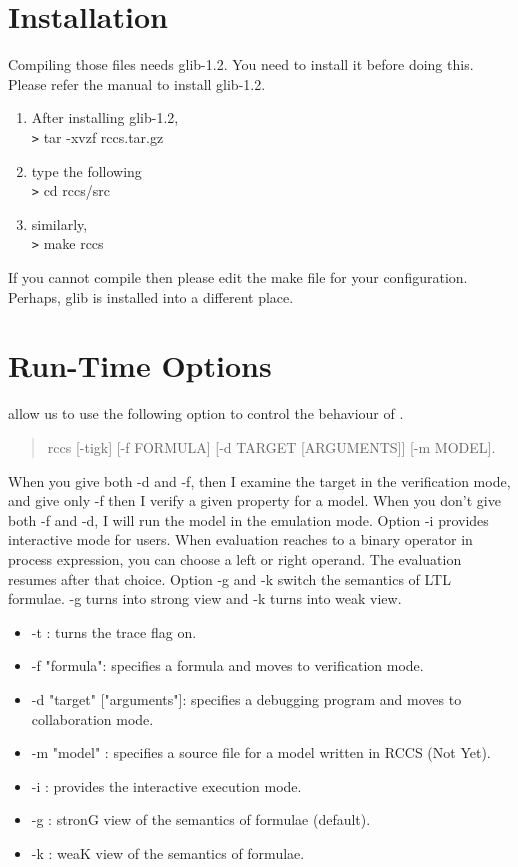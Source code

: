 \documentclass[12pt,a4paper,titlepage]{article}
\theoremstyle{break}
\begin{document}
\section{Installation}
  Compiling those files needs glib-1.2. You need to install it before doing this.
Please refer the manual to install glib-1.2.
  \begin{enumerate}
\item After installing glib-1.2, \\
    \verb|>| tar -xvzf rccs.tar.gz
\item type the following\\
    \verb|>| cd rccs/src
\item  similarly,\\
    \verb|>| make rccs
  \end{enumerate}
If you cannot compile then please edit the make file for your configuration.
Perhaps, glib is installed into a different place.
\section{Run-Time Options}
\NHK allow us to use the following option to control the behaviour of \NHK.
  \begin{quotation}
rccs [-tigk] [-f FORMULA] [-d TARGET [ARGUMENTS]] [-m MODEL].
  \end{quotation}
When you give both -d and -f, then I examine the target in the verification mode, and give only -f then I verify a given property for a model.
When you don't give both -f and -d, I will run the model in the emulation mode.
Option -i provides interactive mode for users.
When evaluation reaches to a binary operator in process expression, you can choose a left or right operand.
The evaluation resumes after that choice.
Option -g and -k switch the semantics of LTL formulae.
-g turns into strong view and -k turns into weak view.
    \begin{itemize}
\item -t : turns the trace flag on.
\item -f "formula": specifies a formula and moves to verification mode.
\item -d "target" ["arguments"]: specifies a debugging program and moves to collaboration mode.
\item -m "model" : specifies a source file for a model written in RCCS (Not Yet).
\item -i : provides the interactive execution mode.
\item -g : stronG view of the semantics of formulae (default).
\item -k : weaK view of the semantics of formulae.
    \end{itemize}
%
%
\end{document}
